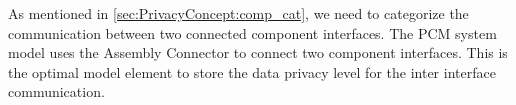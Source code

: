 As mentioned in \autoref{sec:PrivacyConcept:comp_cat}, we need to categorize the communication between two connected component interfaces. The PCM system model uses the Assembly Connector to connect two component interfaces. This is the optimal model element to store the data privacy level for the inter interface communication.






